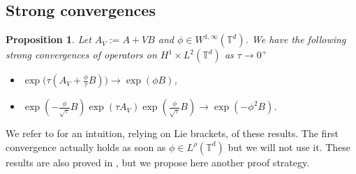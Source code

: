 \documentclass[a4paper]{article}
\theoremstyle{plain}
\newtheorem{proposition}[theorem]{Proposition}
\newcommand{\T}{\mathbb{T}}
\begin{document}
\subsection{Strong convergences}
\label{subsec:SCV}

\begin{proposition} \label{Cor:strongCV}
Let $A_V:=A+VB$ and $\phi \in W^{1,\infty}(\T^d)$. We have the following strong convergences of operators on $H^1 \times L^2(\T^d)$ as $\tau \to 0^+$
\begin{itemize}[topsep=0cm, parsep=0cm, itemsep=0cm]
 \item $\exp\big(\tau (A_V + \frac{\phi}{\tau}B) \big) \longrightarrow \exp(\phi B)$,
 \item $\exp(-\frac{\phi}{\sqrt{\tau}}B) \exp(\tau A_V) \exp( \frac{\phi }{\sqrt{\tau}}B) \longrightarrow \exp(-\phi^2 B)$.
\end{itemize}
\end{proposition}

We refer to  for an intuition, relying on Lie brackets, of these results. The first convergence actually holds as soon as $\phi \in L^{\rho}(\T^d)$ but we will not use it. These results are also proved in \cite{pozzoli}, but we propose here another proof strategy.
\end{document}

